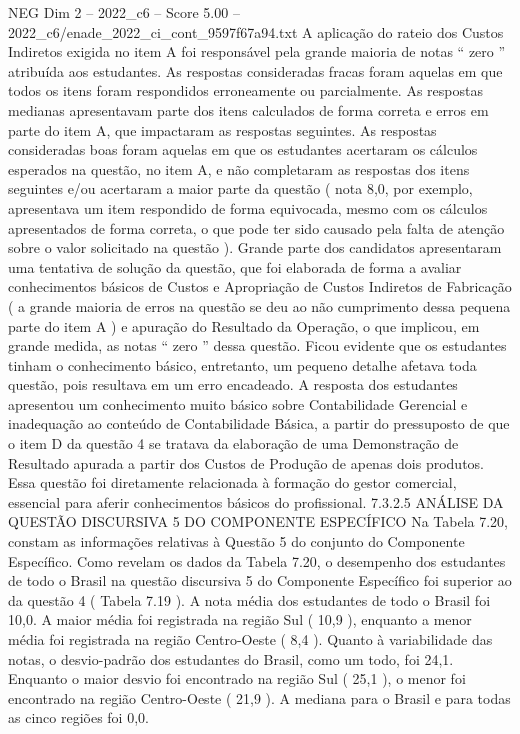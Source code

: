\begin{textsample}{NEG Dim 2 – 2022\_c6 – Score 5.00 – 2022\_c6/enade\_2022\_ci\_cont\_9597f67a94.txt}
A aplicação do rateio dos Custos Indiretos exigida no item A foi responsável pela grande maioria de notas “ zero ” atribuída aos estudantes.
As respostas consideradas fracas foram aquelas em que todos os itens foram respondidos erroneamente ou parcialmente.
As respostas medianas apresentavam parte dos itens calculados de forma correta e erros em parte do item A, que impactaram as respostas seguintes.
As respostas consideradas boas foram aquelas em que os estudantes acertaram os cálculos esperados na questão, no item A, e não completaram as respostas dos itens seguintes e/ou acertaram a maior parte da questão ( nota 8,0, por exemplo, apresentava um item respondido de forma equivocada, mesmo com os cálculos apresentados de forma correta, o que pode ter sido causado pela falta de atenção sobre o valor solicitado na questão ).
Grande parte dos candidatos apresentaram uma tentativa de solução da questão, que foi elaborada de forma a avaliar conhecimentos básicos de Custos e Apropriação de Custos Indiretos de Fabricação ( a grande maioria de erros na questão se deu ao não cumprimento dessa pequena parte do item A ) e apuração do Resultado da Operação, o que implicou, em grande medida, as notas “ zero ” dessa questão.
Ficou evidente que os estudantes tinham o conhecimento básico, entretanto, um pequeno detalhe afetava toda questão, pois resultava em um erro encadeado.
A resposta dos estudantes apresentou um conhecimento muito básico sobre Contabilidade Gerencial e inadequação ao conteúdo de Contabilidade Básica, a partir do pressuposto de que o item D da questão 4 se tratava da elaboração de uma Demonstração de Resultado apurada a partir dos Custos de Produção de apenas dois produtos.
Essa questão foi diretamente relacionada à formação do gestor comercial, essencial para aferir conhecimentos básicos do profissional. 7.3.2.5 ANÁLISE DA QUESTÃO DISCURSIVA 5 DO COMPONENTE ESPECÍFICO Na Tabela 7.20, constam as informações relativas à Questão 5 do conjunto do Componente Específico.
Como revelam os dados da Tabela 7.20, o desempenho dos estudantes de todo o Brasil na questão discursiva 5 do Componente Específico foi superior ao da questão 4 ( Tabela 7.19 ).
A nota média dos estudantes de todo o Brasil foi 10,0.
A maior média foi registrada na região Sul ( 10,9 ), enquanto a menor média foi registrada na região Centro-Oeste ( 8,4 ).
Quanto à variabilidade das notas, o desvio-padrão dos estudantes do Brasil, como um todo, foi 24,1.
Enquanto o maior desvio foi encontrado na região Sul ( 25,1 ), o menor foi encontrado na região Centro-Oeste ( 21,9 ).
A mediana para o Brasil e para todas as cinco regiões foi 0,0.

\end{textsample}

